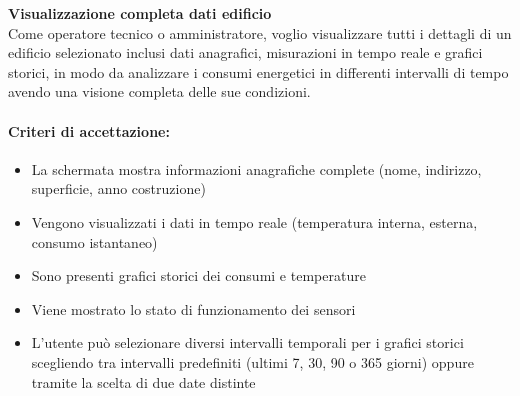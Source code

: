 \textbf{Visualizzazione completa dati edificio} \\
Come operatore tecnico o amministratore, voglio visualizzare tutti i dettagli di un edificio selezionato inclusi dati anagrafici, misurazioni in tempo reale e grafici storici, in modo da analizzare i consumi energetici in differenti intervalli di tempo avendo una visione completa delle sue condizioni.

\paragraph*{Criteri di accettazione:}
\begin{itemize}
    \item La schermata mostra informazioni anagrafiche complete (nome, indirizzo, superficie, anno costruzione)
    \item Vengono visualizzati i dati in tempo reale (temperatura interna, esterna, consumo istantaneo)
    \item Sono presenti grafici storici dei consumi e temperature
    \item Viene mostrato lo stato di funzionamento dei sensori
    \item L'utente può selezionare diversi intervalli temporali per i grafici storici scegliendo tra intervalli predefiniti (ultimi 7, 30, 90 o 365 giorni) oppure tramite la scelta di due date distinte
\end{itemize}

